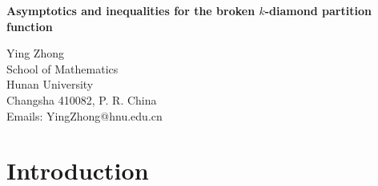 \documentclass[12pt]{article}
\numberwithin{equation}{section}
\begin{document}
\begin{center}

 {\Large \bf Asymptotics and inequalities for the broken $k$-diamond
 partition function}
\end{center}
\vskip 3mm



\begin{center}
Ying Zhong\\[8pt]
School of Mathematics\\
Hunan University\\
Changsha 410082, P. R. China
\\[15pt]

Emails: YingZhong@hnu.edu.cn
\\[15pt]


\end{center}

\vskip 3mm

\begin{abstract}
Many papers have studied inequalities for Andrews and Paule's broken $k$-diamond partition function $\Delta_{k}(n)$ when $k=1$ or $2$. In this paper, we derive an exact formula for $\Delta_{k}(n)$ when $k\geq 1$. Building on this result, we also derive an asymptotic formula for $\Delta_{k}(n)$ with an explicit error bound. Using this formula, we prove that for $k\geq 1$ and sufficiently large $n$, $\Delta_{k}(n)$ satisfies the Tur\'an and Laguerre inequalities of any order and exhibits asymptotic complete monotonicity. Define $n_k:=\max\left\{\left\lceil
8k^{3}+\frac{k+1}{12}\right\rceil,526\right\}$. Furthermore, we show that $\Delta_{k}(n)$ is log-concave for $k\ge3$ and $
n\ge n_k
$. Consequently, it follows that $\Delta_{k}(a)\Delta_{k}(b)\ge\Delta_{k}(a+b)$ for $k\ge3$ and $a,b \ge n_k$.

\vskip 6pt

:11P82, 05A19, 30A10
\\ [7pt]
{\bf Keywords}: broken $k$-diamond partition function, asymptotics, Tur\'an inequalities, Laguerre inequalities, asymptotically complete monotonicity
\end{abstract}


\section{Introduction}
\end{document}
